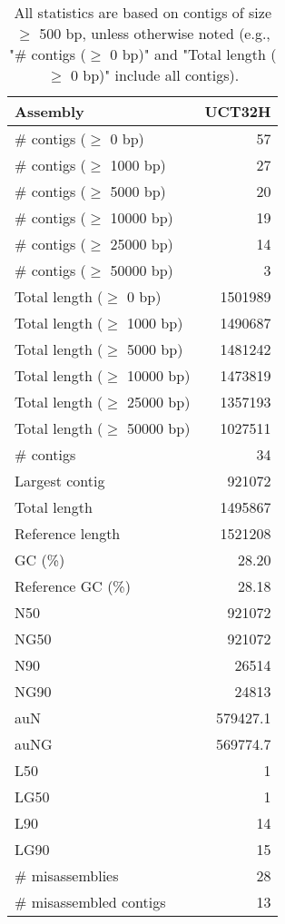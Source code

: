 \documentclass[12pt,a4paper]{article}
\begin{document}
\begin{table}[ht]
\begin{center}
\caption{All statistics are based on contigs of size $\geq$ 500 bp, unless otherwise noted (e.g., "\# contigs ($\geq$ 0 bp)" and "Total length ($\geq$ 0 bp)" include all contigs).}
\begin{tabular}{|l*{1}{|r}|}
\hline
Assembly & UCT32H \\ \hline
\# contigs ($\geq$ 0 bp) & 57 \\ \hline
\# contigs ($\geq$ 1000 bp) & 27 \\ \hline
\# contigs ($\geq$ 5000 bp) & 20 \\ \hline
\# contigs ($\geq$ 10000 bp) & 19 \\ \hline
\# contigs ($\geq$ 25000 bp) & 14 \\ \hline
\# contigs ($\geq$ 50000 bp) & 3 \\ \hline
Total length ($\geq$ 0 bp) & 1501989 \\ \hline
Total length ($\geq$ 1000 bp) & 1490687 \\ \hline
Total length ($\geq$ 5000 bp) & 1481242 \\ \hline
Total length ($\geq$ 10000 bp) & 1473819 \\ \hline
Total length ($\geq$ 25000 bp) & 1357193 \\ \hline
Total length ($\geq$ 50000 bp) & 1027511 \\ \hline
\# contigs & 34 \\ \hline
Largest contig & 921072 \\ \hline
Total length & 1495867 \\ \hline
Reference length & 1521208 \\ \hline
GC (\%) & 28.20 \\ \hline
Reference GC (\%) & 28.18 \\ \hline
N50 & 921072 \\ \hline
NG50 & 921072 \\ \hline
N90 & 26514 \\ \hline
NG90 & 24813 \\ \hline
auN & 579427.1 \\ \hline
auNG & 569774.7 \\ \hline
L50 & 1 \\ \hline
LG50 & 1 \\ \hline
L90 & 14 \\ \hline
LG90 & 15 \\ \hline
\# misassemblies & 28 \\ \hline
\# misassembled contigs & 13 \\ \hline

\end{tabular}
\end{center}
\end{table}
\end{document}
